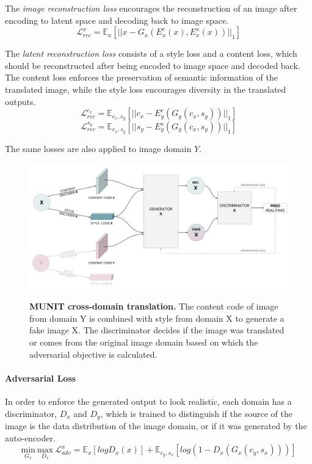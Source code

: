 \documentclass[12pt]{report}
\begin{document}
The \textit{image reconstruction loss} encourages the reconstruction of an image after encoding to latent space and decoding back to image space.
\begin{equation}
\mathcal{L}^{x}_{rec} = \mathbb{E}_{x}[||x - G_{x}(E^{c}_{x}(x), E^{s}_{x}(x))||_{1}]
\end{equation}

The \textit{latent reconstruction loss} consists of a style loss and a content loss, which should be reconstructed after being encoded to image space and decoded back. The content loss enforces the preservation of semantic information of the translated image, while the style loss encourages diversity in the translated outputs.
\begin{equation}
\mathcal{L}^{c_{x}}_{rec} = \mathbb{E}_{c_{x}, s_{y}}[||c_{x} - E^{c}_{y}(G_{y}(c_{x},s_{y}))||_{1}]
\end{equation}
\begin{equation}
\mathcal{L}^{s_{y}}_{rec} = \mathbb{E}_{c_{x}, s_{y}}[||s_{y} - E^{s}_{y}(G_{y}(c_{x},s_{y}))||_{1}]
\end{equation}

The same losses are also applied to image domain $Y$.

\begin{figure}[h]
\centering
{\includegraphics[width=\linewidth]{03_analysis/gans/munit_adv}}
\caption{\label{fig:munit_adv} \textbf{MUNIT cross-domain translation.} The content code of image from domain Y is combined with style from domain X to generate a fake image X. The discriminator decides if the image was translated or comes from the original image domain based on which the adversarial objective is calculated.}
\end{figure}

\paragraph{Adversarial Loss}
In order to enforce the generated output to look realistic, each domain has a discriminator, $D_x$ and $D_y$, which is trained to distinguish if the source of the image is the data distribution of the image domain, or if it was generated by the auto-encoder.
\begin{equation}
\underset{G_x}{\mathrm{min}} \ \underset{D_x}{\mathrm{max}} \ \mathcal{L}^{x}_{adv} = \mathbb{E}_{x}[logD_{x}(x)] + \mathbb{E}_{c_{y}, s_{x}}[log(1 - D_{x}(G_{x}(c_{y}, s_{x})))]
\end{equation}
\end{document}
